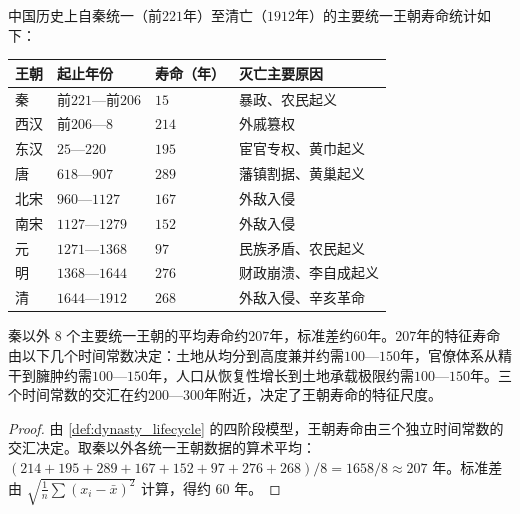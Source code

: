 \begin{proposition}[王朝寿命的统计分布]\label{prop:dynasty_lifespan}
中国历史上自秦统一（前$221$年）至清亡（$1912$年）的主要统一王朝寿命统计如下：
\begin{center}
\begin{tabular}{>{\centering\arraybackslash}p{3cm}>{\centering\arraybackslash}p{2.5cm}>{\centering\arraybackslash}p{2.5cm}>{\centering\arraybackslash}p{3cm}}
\toprule
王朝 & 起止年份 & 寿命（年） & 灭亡主要原因 \\
\midrule
秦 & 前$221$—前$206$ & $15$ & 暴政、农民起义 \\
西汉 & 前$206$—$8$ & $214$ & 外戚篡权 \\
东汉 & $25$—$220$ & $195$ & 宦官专权、黄巾起义 \\
唐 & $618$—$907$ & $289$ & 藩镇割据、黄巢起义 \\
北宋 & $960$—$1127$ & $167$ & 外敌入侵 \\
南宋 & $1127$—$1279$ & $152$ & 外敌入侵 \\
元 & $1271$—$1368$ & $97$ & 民族矛盾、农民起义 \\
明 & $1368$—$1644$ & $276$ & 财政崩溃、李自成起义 \\
清 & $1644$—$1912$ & $268$ & 外敌入侵、辛亥革命 \\
\bottomrule
\end{tabular}
\end{center}
秦以外 $8$ 个主要统一王朝的平均寿命约$207$年，标准差约$60$年。$207$年的特征寿命由以下几个时间常数决定：土地从均分到高度兼并约需$100$—$150$年，官僚体系从精干到臃肿约需$100$—$150$年，人口从恢复性增长到土地承载极限约需$100$—$150$年。三个时间常数的交汇在约$200$—$300$年附近，决定了王朝寿命的特征尺度。
\end{proposition}

\begin{proof}
由 \cref{def:dynasty_lifecycle} 的四阶段模型，王朝寿命由三个独立时间常数的交汇决定。取秦以外各统一王朝数据的算术平均：$(214+195+289+167+152+97+276+268)/8=1658/8\approx207$ 年。标准差由 $\sqrt{\frac{1}{n}\sum(x_i-\bar x)^2}$ 计算，得约 $60$ 年。
\end{proof}


